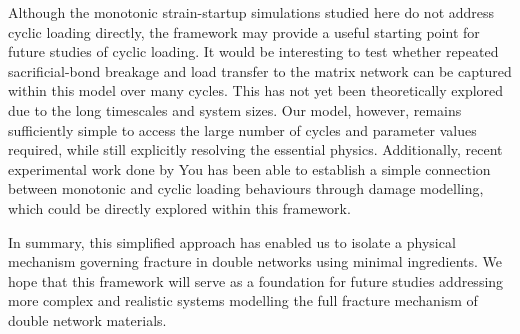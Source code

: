 Although the monotonic strain-startup simulations studied here do not address cyclic loading directly, the framework may provide a useful starting point for future studies of cyclic loading. It would be interesting to test whether repeated sacrificial-bond breakage and load transfer to the matrix network can be captured within this model over many cycles. This has not yet been theoretically explored due to the long timescales and system sizes. Our model, however, remains sufficiently simple to access the large number of cycles and parameter values required, while still explicitly resolving the essential physics. Additionally, recent experimental work done by You \etal \cite{you_damage_2025} has been able to establish a simple connection between monotonic and cyclic loading behaviours through damage modelling, which could be directly explored within this framework.

In summary, this simplified approach has enabled us to isolate a physical mechanism governing fracture in double networks using minimal ingredients. We hope that this framework will serve as a foundation for future studies addressing more complex and realistic systems modelling the full fracture mechanism of double network materials.

